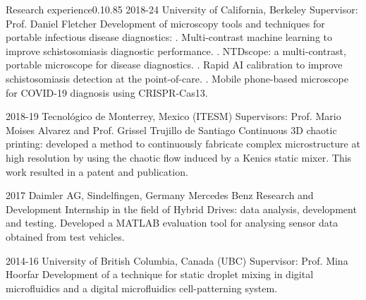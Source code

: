 \documentclass{federico_cv}
\begin{document}
\begin{tblSection}{Research experience}{0.1}{0.85} %
\job
{2018-24}
{University of California, Berkeley}
{Supervisor: Prof. Daniel Fletcher}
{Development of microscopy tools and techniques for portable infectious disease diagnostics:}
{. Multi-contrast machine learning to improve schistosomiasis diagnostic performance.}
{. NTDscope: a multi-contrast, portable microscope for disease diagnostics.}
{. Rapid AI calibration to improve schistosomiasis detection at the point-of-care.}
{. Mobile phone-based microscope for COVID-19 diagnosis using CRISPR-Cas13.}

\job
{2018-19}
{Tecnológico de Monterrey, Mexico (ITESM)}
{Supervisors: Prof. Mario Moises Alvarez and Prof. Grissel Trujillo de Santiago}
{Continuous 3D chaotic printing: developed a method to continuously fabricate complex microstructure at high resolution by using the chaotic flow induced by a Kenics static mixer. This work resulted in a patent and publication.}

\job
{2017}
{Daimler AG, Sindelfingen, Germany}
{Mercedes Benz Research and Development}
{Internship in the field of Hybrid Drives: data analysis, development and testing. Developed a MATLAB evaluation tool for analysing sensor data obtained from test vehicles.}

\job
{2014-16}
{University of British Columbia, Canada (UBC)}
{Supervisor: Prof. Mina Hoorfar}
{Development of a technique for static droplet mixing in digital microfluidics and a digital microfluidics cell-patterning system.}

\end{tblSection}


\printbibliography[keyword={Preprints},title={Manuscripts in Preparation},resetnumbers=true]
\let\thefootnote\relax{}\nocite{*}
\printbibliography[keyword={Publications},title={Publications},resetnumbers=true]
\printbibliography[keyword={Patents},title={Patents},resetnumbers=true]
\pagebreak
\end{document}
